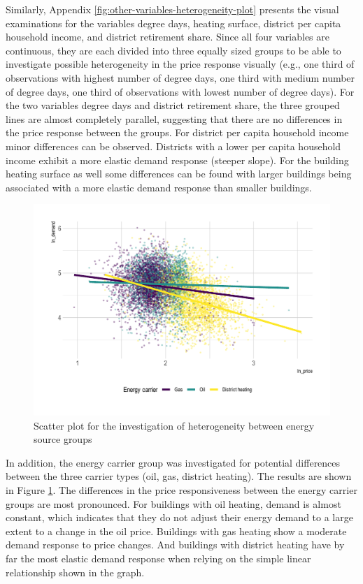 \documentclass[12pt,twoside]{reedthesis}
\begin{document}
Similarly, Appendix \ref{fig:other-variables-heterogeneity-plot} presents the visual examinations for the variables degree days, heating surface, district per capita household income, and district retirement share. Since all four variables are continuous, they are each divided into three equally sized groups to be able to investigate possible heterogeneity in the price response visually (e.g., one third of observations with highest number of degree days, one third with medium number of degree days, one third of observations with lowest number of degree days). For the two variables degree days and district retirement share, the three grouped lines are almost completely parallel, suggesting that there are no differences in the price response between the groups. For district per capita household income minor differences can be observed. Districts with a lower per capita household income exhibit a more elastic demand response (steeper slope). For the building heating surface as well some differences can be found with larger buildings being associated with a more elastic demand response than smaller buildings.
\begin{figure}

{\centering \includegraphics[width=0.8\linewidth]{figure/carrier_heterogeneity_plot} 

}

\caption{Scatter plot for the investigation of heterogeneity between energy source groups}\label{fig:heterogeneity-energy-carrier-plot}
\end{figure}
In addition, the energy carrier group was investigated for potential differences between the three carrier types (oil, gas, district heating). The results are shown in Figure \ref{fig:heterogeneity-energy-carrier-plot}. The differences in the price responsiveness between the energy carrier groups are most pronounced. For buildings with oil heating, demand is almost constant, which indicates that they do not adjust their energy demand to a large extent to a change in the oil price. Buildings with gas heating show a moderate demand response to price changes. And buildings with district heating have by far the most elastic demand response when relying on the simple linear relationship shown in the graph.
\end{document}
